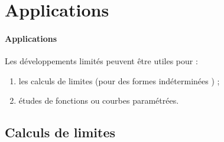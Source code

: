 \documentclass{mybourbaki}
\begin{document}
\section{Applications}

\paragraph{Applications}Les développements limités peuvent être utiles pour : 
\begin{enumerate}
\item les calculs de limites (pour des \og formes indéterminées \fg{}) ;
\item études de fonctions ou courbes paramétrées.
\end{enumerate}

\subsection{Calculs de limites}
\end{document}

